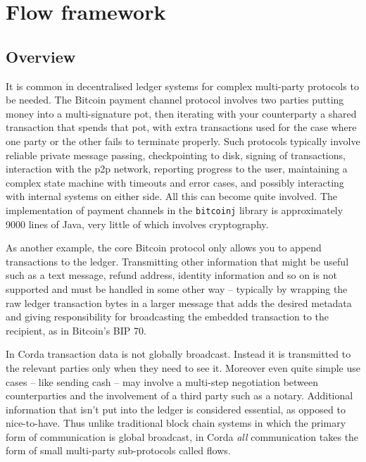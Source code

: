 \documentclass{article}
\begin{document}
\section{Flow framework}\label{sec:flows}

\subsection{Overview}

It is common in decentralised ledger systems for complex multi-party protocols to be needed. The Bitcoin payment
channel protocol\cite{PaymentChannels} involves two parties putting money into a multi-signature pot, then
iterating with your counterparty a shared transaction that spends that pot, with extra transactions used for the
case where one party or the other fails to terminate properly. Such protocols typically involve reliable private
message passing, checkpointing to disk, signing of transactions, interaction with the p2p network, reporting
progress to the user, maintaining a complex state machine with timeouts and error cases, and possibly interacting
with internal systems on either side. All this can become quite involved. The implementation of payment channels in
the \texttt{bitcoinj} library is approximately 9000 lines of Java, very little of which involves cryptography.

As another example, the core Bitcoin protocol only allows you to append transactions to the ledger. Transmitting
other information that might be useful such as a text message, refund address, identity information and so on is
not supported and must be handled in some other way -- typically by wrapping the raw ledger transaction bytes in a
larger message that adds the desired metadata and giving responsibility for broadcasting the embedded transaction
to the recipient, as in Bitcoin's BIP 70\cite{BIP70}.

In Corda transaction data is not globally broadcast. Instead it is transmitted to the relevant parties only when
they need to see it. Moreover even quite simple use cases -- like sending cash -- may involve a multi-step
negotiation between counterparties and the involvement of a third party such as a notary. Additional information
that isn't put into the ledger is considered essential, as opposed to nice-to-have. Thus unlike traditional block
chain systems in which the primary form of communication is global broadcast, in Corda \emph{all} communication
takes the form of small multi-party sub-protocols called flows.
\end{document}
